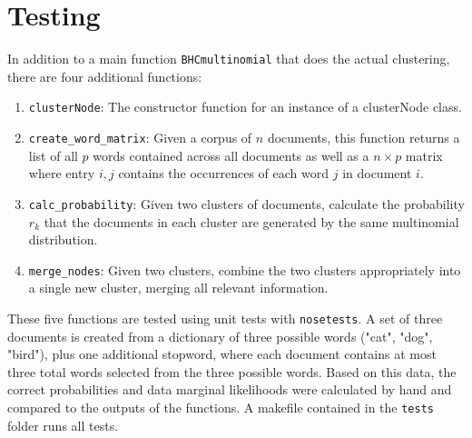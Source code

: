 \documentclass{article}
\begin{document}
\section{Testing}
In addition to a main function \texttt{BHCmultinomial} that does the actual clustering, there are four additional functions:
\begin{enumerate}
    \item \texttt{clusterNode}: The constructor function for an instance of a clusterNode class.
    \item \texttt{create\_word\_matrix}: Given a corpus of $n$ documents, this function returns a list of all $p$ words contained across all documents as well as a $n \times p$ matrix where entry $i,j$ contains the occurrences of each word $j$ in document $i$.
    \item \texttt{calc\_probability}: Given two clusters of documents, calculate the probability $r_k$ that the documents in each cluster are generated by the same multinomial distribution.
    \item \texttt{merge\_nodes}: Given two clusters, combine the two clusters appropriately into a single new cluster, merging all relevant information.
\end{enumerate}
These five functions are tested using unit tests with \texttt{nosetests}.  A set of three documents is created from a dictionary of three possible words ("cat", "dog", "bird"), plus one additional stopword, where each document contains at most three total words selected from the three possible words.  Based on this data, the correct probabilities and data marginal likelihoods were calculated by hand and compared to the outputs of the functions.  A makefile contained in the \texttt{tests} folder runs all tests.
\end{document}
